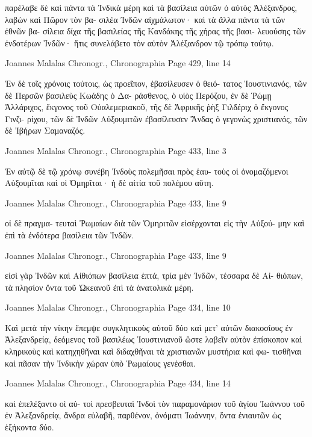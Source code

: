 \documentclass[12pt,letterpaper,twoside,final]{memoir}
\begin{document}
\begin{greek}
               παρέλαβε δὲ καὶ πάντα τὰ Ἰνδικὰ μέρη καὶ τὰ 
βασίλεια αὐτῶν ὁ αὐτὸς Ἀλέξανδρος, λαβὼν καὶ Πῶρον τὸν βα-
σιλέα Ἰνδῶν αἰχμάλωτον· καὶ τὰ ἄλλα πάντα τὰ τῶν ἐθνῶν βα-
σίλεια δίχα τῆς βασιλείας τῆς Κανδάκης τῆς χήρας τῆς βασι-
λευούσης τῶν ἐνδοτέρων Ἰνδῶν· ἥτις συνελάβετο τὸν αὐτὸν 
Ἀλέξανδρον τῷ τρόπῳ τούτῳ. 


Joannes Malalas Chronogr., Chronographia 
Page 429, line 14

Ἐν δὲ τοῖς χρόνοις τούτοις, ὡς προεῖπον, ἐβασίλευσεν ὁ θειό-
τατος Ἰουστινιανός, τῶν δὲ Περσῶν βασιλεὺς Κωάδης ὁ Δα-
ράσθενος, ὁ υἱὸς Περόζου, ἐν δὲ Ῥώμῃ Ἀλλάριχος, ἔκγονος τοῦ 
Οὐαλεμεριακοῦ, τῆς δὲ Ἀφρικῆς ῥὴξ Γιλδέριχ ὁ ἔκγονος Γινζι-
ρίχου, τῶν δὲ Ἰνδῶν Αὐξουμιτῶν ἐβασίλευσεν Ἄνδας ὁ γεγονὼς 
χριστιανός, τῶν δὲ Ἰβήρων Σαμαναζός. 



Joannes Malalas Chronogr., Chronographia 
Page 433, line 3

Ἐν αὐτῷ δὲ τῷ χρόνῳ συνέβη Ἰνδοὺς πολεμῆσαι πρὸς ἑαυ-
τοὺς οἱ ὀνομαζόμενοι Αὐξουμῖται καὶ οἱ Ὁμηρῖται· ἡ δὲ αἰτία 
τοῦ πολέμου αὕτη. 



Joannes Malalas Chronogr., Chronographia 
Page 433, line 9

                                                          οἱ δὲ πραγμα-
τευταὶ Ῥωμαίων διὰ τῶν Ὁμηριτῶν εἰσέρχονται εἰς τὴν Αὐξού-
μην καὶ ἐπὶ τὰ ἐνδότερα βασίλεια τῶν Ἰνδῶν. 



Joannes Malalas Chronogr., Chronographia 
Page 433, line 9

                                                       εἰσὶ γὰρ Ἰνδῶν 
καὶ Αἰθιόπων βασίλεια ἑπτά, τρία μὲν Ἰνδῶν, τέσσαρα δὲ Αἰ-
θιόπων, τὰ πλησίον ὄντα τοῦ Ὠκεανοῦ ἐπὶ τὰ ἀνατολικὰ μέρη. 



Joannes Malalas Chronogr., Chronographia 
Page 434, line 10

Καὶ μετὰ τὴν νίκην ἔπεμψε συγκλητικοὺς αὐτοῦ δύο καὶ 
μετ' αὐτῶν διακοσίους ἐν Ἀλεξανδρείᾳ, δεόμενος τοῦ βασιλέως 
Ἰουστινιανοῦ ὥστε λαβεῖν αὐτὸν ἐπίσκοπον καὶ κληρικοὺς καὶ 
κατηχηθῆναι καὶ διδαχθῆναι τὰ χριστιανῶν μυστήρια καὶ φω-
τισθῆναι καὶ πᾶσαν τὴν Ἰνδικὴν χώραν ὑπὸ Ῥωμαίους γενέσθαι. 



Joannes Malalas Chronogr., Chronographia 
Page 434, line 14

                                              καὶ ἐπελέξαντο οἱ αὐ-
τοὶ πρεσβευταὶ Ἰνδοὶ τὸν παραμονάριον τοῦ ἁγίου Ἰωάννου τοῦ 
ἐν Ἀλεξανδρείᾳ, ἄνδρα εὐλαβῆ, παρθένον, ὀνόματι Ἰωάννην, 
ὄντα ἐνιαυτῶν ὡς ἑξήκοντα δύο. 




\end{greek}
\end{document}
